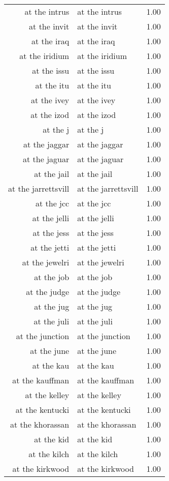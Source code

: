 \begin{table}[ht]
\begin{tabular}{rlr}
  at the intrus & at the intrus & 1.00 \\ 
  at the invit & at the invit & 1.00 \\ 
  at the iraq & at the iraq & 1.00 \\ 
  at the iridium & at the iridium & 1.00 \\ 
  at the issu & at the issu & 1.00 \\ 
  at the itu & at the itu & 1.00 \\ 
  at the ivey & at the ivey & 1.00 \\ 
  at the izod & at the izod & 1.00 \\ 
  at the j & at the j & 1.00 \\ 
  at the jaggar & at the jaggar & 1.00 \\ 
  at the jaguar & at the jaguar & 1.00 \\ 
  at the jail & at the jail & 1.00 \\ 
  at the jarrettsvill & at the jarrettsvill & 1.00 \\ 
  at the jcc & at the jcc & 1.00 \\ 
  at the jelli & at the jelli & 1.00 \\ 
  at the jess & at the jess & 1.00 \\ 
  at the jetti & at the jetti & 1.00 \\ 
  at the jewelri & at the jewelri & 1.00 \\ 
  at the job & at the job & 1.00 \\ 
  at the judge & at the judge & 1.00 \\ 
  at the jug & at the jug & 1.00 \\ 
  at the juli & at the juli & 1.00 \\ 
  at the junction & at the junction & 1.00 \\ 
  at the june & at the june & 1.00 \\ 
  at the kau & at the kau & 1.00 \\ 
  at the kauffman & at the kauffman & 1.00 \\ 
  at the kelley & at the kelley & 1.00 \\ 
  at the kentucki & at the kentucki & 1.00 \\ 
  at the khorassan & at the khorassan & 1.00 \\ 
  at the kid & at the kid & 1.00 \\ 
  at the kilch & at the kilch & 1.00 \\ 
  at the kirkwood & at the kirkwood & 1.00 \\ 

\end{tabular}
\end{table}
